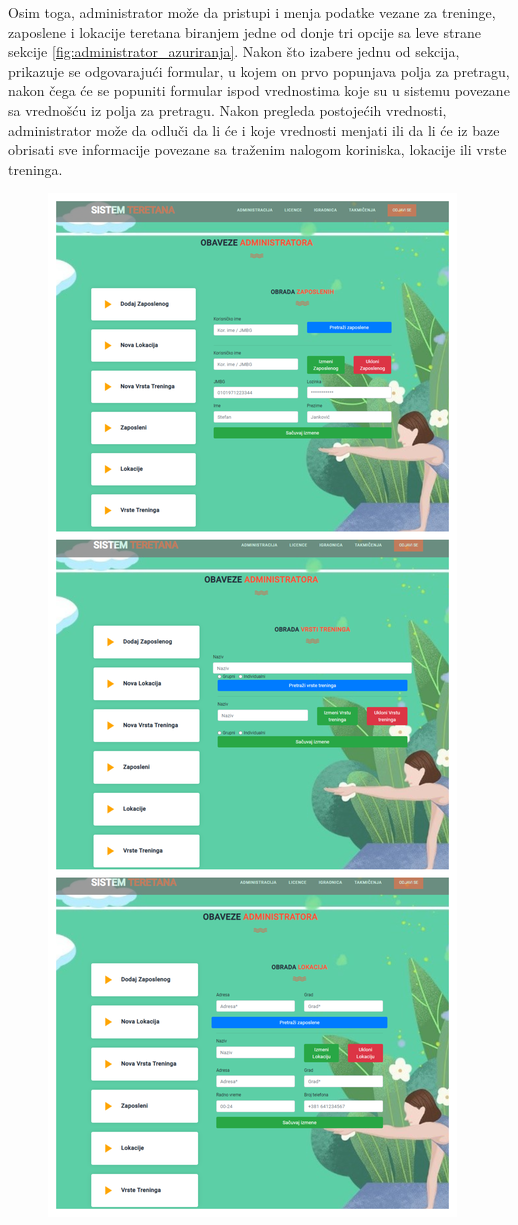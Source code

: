 \documentclass[../main.tex]{subfiles}
\begin{document}
Osim toga, administrator može da pristupi i menja podatke vezane za treninge, zaposlene i lokacije teretana biranjem jedne od donje tri opcije sa leve strane sekcije \ref{fig:administrator_azuriranja}. Nakon što izabere jednu od sekcija, prikazuje se odgovarajući formular, u kojem on prvo popunjava polja za pretragu, nakon čega će se popuniti formular ispod vrednostima koje su u sistemu povezane sa vrednošću iz polja za pretragu. Nakon pregleda postojećih vrednosti, administrator može da odluči da li će i koje vrednosti menjati ili da li će iz baze obrisati sve informacije povezane sa traženim nalogom koriniska, lokacije ili vrste treninga.


\begin{figure}[!ht]
\begin{center}
\includegraphics[scale=0.35]{sections/korisnicki_interfejs/screenshots/administrator_azuriranje.png}

\end{center}
\end{figure}
\end{document}
